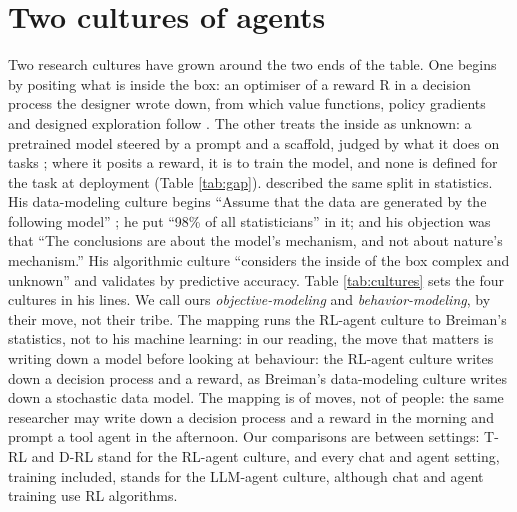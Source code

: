 \documentclass{article}
\begin{document}
\hypertarget{sec:cultures}{%
\section{Two cultures of agents}\label{sec:cultures}}

Two research cultures have grown around the two ends of the table. One begins by positing what is inside the box: an optimiser of a reward R in a decision process the designer wrote down, from which value functions, policy gradients and designed exploration follow \citep{sutton2018, schulman2017}. The other treats the inside as unknown: a pretrained model steered by a prompt and a scaffold, judged by what it does on tasks \citep{yao2023b, kapoor2024}; where it posits a reward, it is to train the model, and none is defined for the task at deployment (Table \ref{tab:gap}). \citet{breiman2001} described the same split in statistics. His data-modeling culture begins ``Assume that the data are generated by the following model'' \citep{breiman2001}; he put ``98\% of all statisticians'' \citep{breiman2001} in it; and his objection was that ``The conclusions are about the model's mechanism, and not about nature's mechanism.'' \citep{breiman2001} His algorithmic culture ``considers the inside of the box complex and unknown'' \citep{breiman2001} and validates by predictive accuracy. Table \ref{tab:cultures} sets the four cultures in his lines. We call ours \emph{objective-modeling} and \emph{behavior-modeling}, by their move, not their tribe. The mapping runs the RL-agent culture to Breiman's statistics, not to his machine learning: in our reading, the move that matters is writing down a model before looking at behaviour: the RL-agent culture writes down a decision process and a reward, as Breiman's data-modeling culture writes down a stochastic data model. The mapping is of moves, not of people: the same researcher may write down a decision process and a reward in the morning and prompt a tool agent in the afternoon. Our comparisons are between settings: T-RL and D-RL stand for the RL-agent culture, and every chat and agent setting, training included, stands for the LLM-agent culture, although chat and agent training use RL algorithms.
\end{document}
